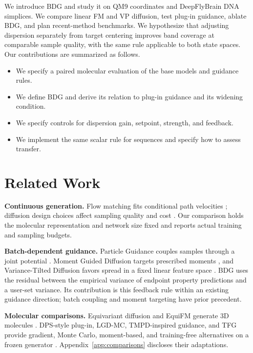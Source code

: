 \documentclass{article}
\begin{document}
We introduce BDG and study it on QM9 coordinates and DeepFlyBrain DNA simplices. We compare linear FM and VP diffusion, test plug-in guidance, ablate BDG, and plan recent-method benchmarks. We hypothesize that adjusting dispersion separately from target centering improves band coverage at comparable sample quality, with the same rule applicable to both state spaces. Our contributions are summarized as follows.
\begin{itemize}
\item We specify a paired molecular evaluation of the base models and guidance rules.
\item We define BDG and derive its relation to plug-in guidance and its widening condition.
\item We specify controls for dispersion gain, setpoint, strength, and feedback.
\item We implement the same scalar rule for sequences and specify how to assess transfer.
\end{itemize}

\section{Related Work}
\textbf{Continuous generation.} Flow matching fits conditional path velocities \citep{lipman2022flow}; diffusion design choices affect sampling quality and cost \citep{karras2022elucidating}. Our comparison holds the molecular representation and network size fixed and reports actual training and sampling budgets.

\textbf{Batch-dependent guidance.} Particle Guidance couples samples through a joint potential \citep{corso2024particle}. Moment Guided Diffusion targets prescribed moments \citep{mgd2026moment}, and Variance-Tilted Diffusion favors spread in a fixed linear feature space \citep{vtd2026variance}. BDG uses the residual between the empirical variance of endpoint property predictions and a user-set variance. Its contribution is this feedback rule within an existing guidance direction; batch coupling and moment targeting have prior precedent.

\textbf{Molecular comparisons.} Equivariant diffusion and EquiFM generate 3D molecules \citep{hoogeboom2022equivariant,song2023equifm}. DPS-style plug-in, LGD-MC, TMPD-inspired guidance, and TFG provide gradient, Monte Carlo, moment-based, and training-free alternatives on a frozen generator \citep{chung2023dps,song2023lgd,boys2024tmpd,ye2024tfg}. Appendix~\ref{app:comparisons} discloses their adaptations.
\end{document}
